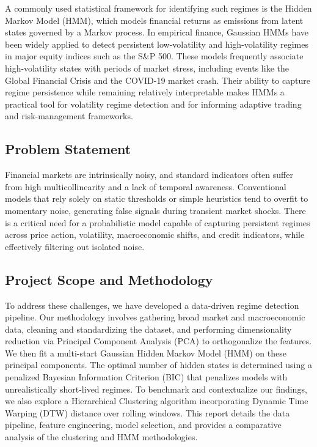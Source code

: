 \documentclass[a4paper,fleqn]{cas-dc} %
\begin{document}
A commonly used statistical framework for identifying such regimes is the Hidden Markov Model (HMM), which models financial returns as emissions from latent states governed by a Markov process. In empirical finance, Gaussian HMMs have been widely applied to detect persistent low-volatility and high-volatility regimes in major equity indices such as the S\&P 500. These models frequently associate high-volatility states with periods of market stress, including events like the Global Financial Crisis and the COVID-19 market crash. Their ability to capture regime persistence while remaining relatively interpretable makes HMMs a practical tool for volatility regime detection and for informing adaptive trading and risk-management frameworks.

\subsection{Problem Statement}
Financial markets are intrinsically noisy, and standard indicators often suffer from high multicollinearity and a lack of temporal awareness. Conventional models that rely solely on static thresholds or simple heuristics tend to overfit to momentary noise, generating false signals during transient market shocks. There is a critical need for a probabilistic model capable of capturing persistent regimes across price action, volatility, macroeconomic shifts, and credit indicators, while effectively filtering out isolated noise.

\subsection{Project Scope and Methodology}
To address these challenges, we have developed a data-driven regime detection pipeline. Our methodology involves gathering broad market and macroeconomic data, cleaning and standardizing the dataset, and performing dimensionality reduction via Principal Component Analysis (PCA) to orthogonalize the features. We then fit a multi-start Gaussian Hidden Markov Model (HMM) on these principal components. The optimal number of hidden states is determined using a penalized Bayesian Information Criterion (BIC) that penalizes models with unrealistically short-lived regimes. To benchmark and contextualize our findings, we also explore a Hierarchical Clustering algorithm incorporating Dynamic Time Warping (DTW) distance over rolling windows. This report details the data pipeline, feature engineering, model selection, and provides a comparative analysis of the clustering and HMM methodologies.
\end{document}
